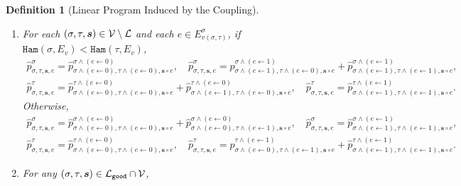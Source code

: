 \documentclass[11pt]{article}
\newtheorem{definition}[theorem]{Definition}
\def\!#1{\mathtt{#1}}
\newcommand{\seqS}{\boldsymbol{s}}
\begin{document}
\begin{definition}[Linear Program Induced by the Coupling]
\begin{enumerate}
        \item For each $(\sigma, \tau, \seqS)\in \+V\setminus\+L$ and each $e\in E_{v(\sigma,\tau)}^{\sigma}$,
            if ${\!{Ham}\left(\sigma,{E_v}\right)}<{\!{Ham}\left(\tau,{E_v}\right)}$, 
            \begin{align}\label{eqn-hat-inner-child-sum1}
                \widehat{p}^{\sigma}_{\sigma,\tau,\seqS,e}=\widehat{p}^{\sigma\land (e\gets 0)}_{\sigma\land (e\gets 0),\tau\land (e\gets 0), \seqS \circ e}, \quad  \widehat{p}^{\sigma}_{\sigma,\tau, \seqS,e}=\widehat{p}^{\sigma\land (e\gets 1)}_{\sigma\land (e\gets 1),\tau\land (e\gets 0), \seqS \circ e} + \widehat{p}^{\sigma \land (e\gets 1)}_{\sigma\land (e\gets 1),\tau \land (e\gets 1), \seqS \circ e},
            \end{align}
            \begin{align}\label{eqn-hat-inner-child-sum2}
                \widehat{p}^{\tau}_{\sigma,\tau, \seqS,e}=\widehat{p}^{\tau\land (e\gets 0)}_{\sigma\land (e\gets 0),\tau\land (e\gets 0), \seqS\circ e}+\widehat{p}^{\tau\land (e\gets 0)}_{\sigma\land (e\gets 1),\tau\land (e\gets 0), \seqS \circ e}, \quad  \widehat{p}^{\tau}_{\sigma,\tau,\seqS,e}=\widehat{p}^{\tau\land (e\gets 1)}_{\sigma\land (e\gets 1),\tau\land (e\gets 1),\seqS\circ e}.
            \end{align}
            Otherwise, 
            \begin{align}\label{eqn-hat-inner-child-sum3}
                 \widehat{p}^{\sigma}_{\sigma,\tau,\seqS,e}= \widehat{p}^{\sigma \land (e\gets 0)}_{\sigma\land (e\gets 0),\tau\land (e\gets 0),\seqS\circ e}+ \widehat{p}^{\sigma\land (e\gets 0)}_{\sigma\land (e\gets 0),\tau\land (e\gets 1), \seqS\circ e}, \quad  \widehat{p}^{\sigma}_{\sigma,\tau,\seqS,e}=\widehat{p}^{\sigma\land (e\gets 1)}_{\sigma\land (e\gets 1),\tau\land (e\gets 1), \seqS\circ e},
            \end{align}
            \begin{align}\label{eqn-hat-inner-child-sum4}
                 \widehat{p}^{\tau}_{\sigma,\tau,\seqS,e}= \widehat{p}^{\tau\land (e\gets 0)}_{\sigma\land (e\gets 0),\tau\land (e\gets 0),\seqS\circ e}, \quad   \widehat{p}^{\tau}_{\sigma,\tau,\seqS,e}= \widehat{p}^{\tau\land (e\gets 1)}_{\sigma\land (e\gets 0),\tau\land (e\gets 1),\seqS\circ e} +  \widehat{p}^{\tau \land (e\gets 1)}_{\sigma\land (e\gets 1),\tau\land (e\gets 1),\seqS\circ e}.
            \end{align} \label{item-third-LP}
        \item For any $(\sigma,\tau,\seqS)\in \+L_{\!{good}}\cap \+V$,

\end{enumerate}
\end{definition}
\end{document}
